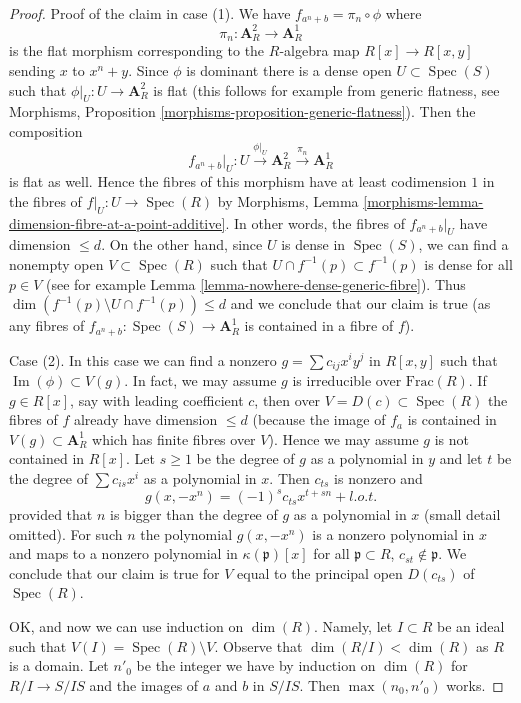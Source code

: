 \documentclass[10pt,a4paper]{amsart}
\theoremstyle{plain}
\theoremstyle{definition}
\theoremstyle{remark}
\numberwithin{equation}{subsection}
\def\Spec{\mathop{\mathrm{Spec}}}
\def\Im{\mathop{\mathrm{Im}}}
\begin{document}
\begin{proof}
\medskip\noindent
Proof of the claim in case (1). We have $f_{a^n + b} = \pi_n \circ \phi$
where
$$
\pi_n :  \mathbf{A}^2_R \to \mathbf{A}^1_R
$$
is the flat morphism corresponding to the $R$-algebra map $R[x] \to R[x, y]$
sending $x$ to $x^n + y$. Since $\phi$ is dominant there is a dense open
$U \subset \Spec(S)$ such that $\phi|_U : U \to \mathbf{A}^2_R$ is flat
(this follows for example from generic flatness, see
Morphisms, Proposition \ref{morphisms-proposition-generic-flatness}).
Then the composition
$$
f_{a^n + b}|_U :
U \xrightarrow{\phi|_U}
\mathbf{A}^2_R
\xrightarrow{\pi_n}
\mathbf{A}^1_R
$$
is flat as well. Hence the fibres of this morphism have at least
codimension $1$ in the fibres of $f|_U : U \to \Spec(R)$ by
Morphisms, Lemma \ref{morphisms-lemma-dimension-fibre-at-a-point-additive}.
In other words, the fibres of $f_{a^n + b}|_U$ have dimension $\leq d$.
On the other hand, since $U$ is dense in $\Spec(S)$, we can find a nonempty
open $V \subset \Spec(R)$ such that $U \cap f^{-1}(p) \subset f^{-1}(p)$
is dense for all $p \in V$ (see for example Lemma
\ref{lemma-nowhere-dense-generic-fibre}).
Thus $\dim(f^{-1}(p) \setminus U \cap f^{-1}(p)) \leq d$ and
we conclude that our claim is true (as any fibres of
$f_{a^n + b} : \Spec(S) \to \mathbf{A}^1_R$
is contained in a fibre of $f$).

\medskip\noindent
Case (2). In this case we can find a nonzero $g = \sum c_{ij} x^i y^j$
in $R[x, y]$ such that $\Im(\phi) \subset V(g)$. In fact, we may assume
$g$ is irreducible over $\text{Frac}(R)$. If $g \in R[x]$, say with leading
coefficient $c$, then over $V = D(c) \subset \Spec(R)$ the fibres of
$f$ already have dimension $\leq d$ (because the image of $f_a$ is contained
in $V(g) \subset \mathbf{A}^1_R$ which has finite fibres over $V$). Hence
we may assume $g$ is not contained in $R[x]$.
Let $s \geq 1$ be the degree of $g$ as a polynomial in $y$ and
let $t$ be the degree of $\sum c_{is} x^i$ as a polynomial in $x$.
Then $c_{ts}$ is nonzero and
$$
g(x, -x^n) = (-1)^s c_{ts} x^{t + sn} + l.o.t.
$$
provided that $n$ is bigger than the degree of $g$ as a polynomial in $x$
(small detail omitted). For such $n$ the polynomial $g(x, -x^n)$ 
is a nonzero polynomial in $x$ and maps to a nonzero polynomial in
$\kappa(\mathfrak p)[x]$ for all $\mathfrak p \subset R$,
$c_{st} \not \in \mathfrak p$. We conclude that our claim is
true for $V$ equal to the principal open $D(c_{ts})$ of $\Spec(R)$.

\medskip\noindent
OK, and now we can use induction on $\dim(R)$. Namely, let
$I \subset R$ be an ideal such that $V(I) = \Spec(R) \setminus V$.
Observe that $\dim(R/I) < \dim(R)$ as $R$ is a domain.
Let $n'_0$ be the integer we have by induction on $\dim(R)$
for $R/I \to S/IS$ and the images of $a$ and $b$ in $S/IS$.
Then $\max(n_0, n'_0)$ works.
\end{proof}
\end{document}
